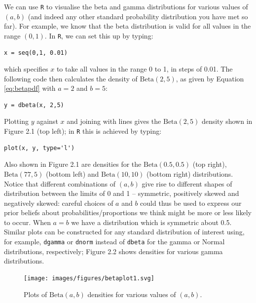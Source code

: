 \noindent We can use \texttt{R} to visualise the beta and gamma distributions for various values of $(a,b)$ (and indeed any other standard probability distribution you have met so far).  For example, we know that the beta distribution is valid for all values in the range $(0,1)$.  In \texttt{R}, we can set this up by typing:
\begin{verbatim}
x = seq(0,1, 0.01)
\end{verbatim}
which specifies $x$ to take all values in the range 0 to 1, in steps of 0.01.  The following code then calculates the density of $\mathrm{Beta}(2,5)$, as given by Equation \eqref{eq:betapdf} with $a=2$ and $b=5$:
\begin{verbatim}
y = dbeta(x, 2,5)
\end{verbatim}
Plotting $y$ against $x$ and joining with lines gives the $\mathrm{Beta}(2,5)$ density shown in Figure 2.1 (top left); in \texttt{R} this is achieved by typing:
\begin{verbatim}
plot(x, y, type='l')
\end{verbatim}
\noindent Also shown in Figure 2.1 are densities for the $\mathrm{Beta}(0.5,0.5)$ (top right), $\mathrm{Beta}(77,5)$ (bottom left) and  $\mathrm{Beta}(10,10)$ (bottom right) distributions.  Notice that different combinations of $(a,b)$ give rise to different shapes of distribution between the limits of 0 and 1 -- symmetric, positively skewed and negatively skewed: careful choices of $a$ and $b$ could thus be used to express our prior beliefs about probabilities/proportions we think might be more or less likely to occur.  When $a=b$ we have a distribution which is symmetric about 0.5.  Similar plots can be constructed for any standard distribution of interest using, for example, \texttt{dgamma} or \texttt{dnorm} instead of \texttt{dbeta} for the gamma or Normal distributions, respectively; Figure 2.2 shows densities for various gamma distributions.\begin{figure}[!h]
\centering
\texttt{[image: images/figures/betaplot1.svg]}
\caption{Plots of $\mathrm{Beta}(a,b)$ densities for various values of $(a,b)$.}
\end{figure}



